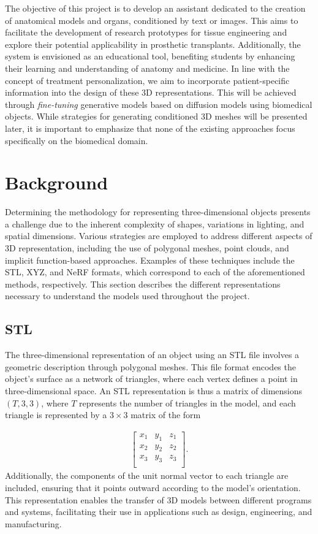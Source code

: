 \documentclass[journal]{IEEEtran}
\begin{document}
The objective of this project is to develop an assistant dedicated to the creation of anatomical models and organs, conditioned by text or images. This aims to facilitate the development of research prototypes for tissue engineering and explore their potential applicability in prosthetic transplants. Additionally, the system is envisioned as an educational tool, benefiting students by enhancing their learning and understanding of anatomy and medicine. In line with the concept of treatment personalization, we aim to incorporate patient-specific information into the design of these 3D representations. This will be achieved through \textit{fine-tuning} generative models based on diffusion models using biomedical objects. While strategies for generating conditioned 3D meshes will be presented later, it is important to emphasize that none of the existing approaches focus specifically on the biomedical domain.


\section{Background}
Determining the methodology for representing three-dimensional objects presents a challenge due to the inherent complexity of shapes, variations in lighting, and spatial dimensions. Various strategies are employed to address different aspects of 3D representation, including the use of polygonal meshes, point clouds, and implicit function-based approaches. Examples of these techniques include the STL, XYZ, and NeRF formats, which correspond to each of the aforementioned methods, respectively. This section describes the different representations necessary to understand the models used throughout the project.

\subsection{STL}
The three-dimensional representation of an object using an STL file involves a geometric description through polygonal meshes. This file format encodes the object's surface as a network of triangles, where each vertex defines a point in three-dimensional space. An STL representation is thus a matrix of dimensions $(T,3,3)$, where $T$ represents the number of triangles in the model, and each triangle is represented by a $3\times3$ matrix of the form

\begin{align*}
\begin{bmatrix}
    x_1 & y_1 & z_1 \\
    x_2 & y_2 & z_2 \\
    x_3 & y_3 & z_3 \\
\end{bmatrix}.
\end{align*}
Additionally, the components of the unit normal vector to each triangle are included, ensuring that it points outward according to the model's orientation. This representation enables the transfer of 3D models between different programs and systems, facilitating their use in applications such as design, engineering, and manufacturing.
\end{document}
